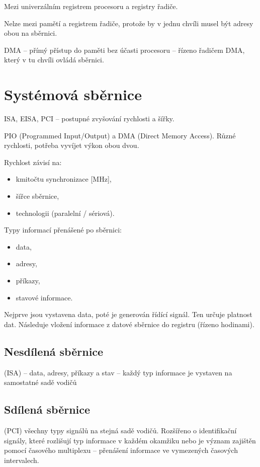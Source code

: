 \documentclass[a4paper, 11pt]{report}
\begin{document}
Mezi univerzálním registrem procesoru a registry řadiče.

Nelze mezi pamětí a registrem řadiče, protože by v jednu chvíli musel být adresy obou na sběrnici.

DMA -- přímý přístup do paměti bez účasti procesoru -- řízeno řadičem DMA, který v tu chvíli ovládá sběrnici.

\section{Systémová sběrnice}

ISA, EISA, PCI -- postupné zvyšování rychlosti a šířky.

PIO (Programmed Input/Output) a DMA (Direct Memory Access). Různé rychlosti, potřeba vyvíjet výkon obou dvou.

Rychlost závisí na:
\begin{itemize}
	\item kmitočtu synchronizace [MHz],
	\item šířce sběrnice,
	\item technologii (paralelní / sériová).
\end{itemize}

Typy informací přenášené po sběrnici:
\begin{itemize}
	\item data,
	\item adresy,
	\item příkazy,
	\item stavové informace.
\end{itemize}

Nejprve jsou vystavena data, poté je generován řídící signál. Ten určuje platnost dat. Následuje vložení informace z datové sběrnice do registru (řízeno hodinami).

\subsection{Nesdílená sběrnice}
(ISA) -- data, adresy, příkazy a stav -- každý typ informace je vystaven na samostatné sadě vodičů

\subsection{Sdílená sběrnice}
(PCI) všechny typy signálů na stejná sadě vodičů. Rozšířeno o identifikační signály, které rozlišují typ informace v každém okamžiku nebo je význam zajištěn pomocí časového multiplexu -- přenášení informace ve vymezených časových intervalech.
\end{document}
